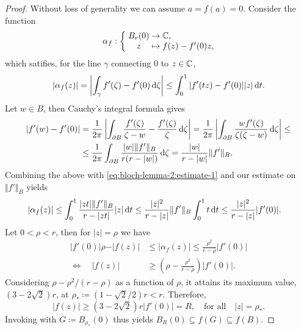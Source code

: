 \begin{proof}
    Without loss of generality we can assume $a = f(a) = 0$. Consider the function
    $$ \mapping{\alpha_f}{B_{r}(0) & \to & \C,}{z & \mapsto & f(z) - f'(0) z,} $$
    which satifies, for the line $\gamma$ connecting $0$ to $z \in \mathbb{C}$,
    \begin{equation} \label{eq:bloch-lemma-2:estimate-1}
        \vert \alpha_f(z) \vert = \left\vert \int_\gamma f'(\zeta) - f'(0) \mathop{}\!\mathrm{d} \zeta \right\vert \leq \int_0^1 \vert f'(t z) - f'(0) \vert \vert z \vert \mathop{}\!\mathrm{d} t.
    \end{equation}
    Let $w \in B$, then Cauchy's integral formula gives
    \begin{align*}
        \vert f'(w) - f'(0) \vert &= \frac{1}{2\pi} \left\vert \int_{\partial B} \frac{f'(\zeta)}{\zeta - w} - \frac{f'(\zeta)}{\zeta} \mathop{}\!\mathrm{d} \zeta \right\vert = \frac{1}{2\pi} \left\vert \int_{\partial B} \frac{w f'(\zeta)}{\zeta (\zeta - w)} \mathop{}\!\mathrm{d} \zeta \right\vert \leq \\
        &\leq \frac{1}{2\pi} \int_{\partial B} \frac{\vert w \vert \Vert f' \Vert_B}{r(r - \vert w \vert)} \mathop{}\!\mathrm{d} \zeta = \frac{\vert w \vert}{r - \vert w \vert} \Vert f' \Vert_B.
    \end{align*}
    Combining the above with \cref{eq:bloch-lemma-2:estimate-1} and our estimate on $\Vert f' \Vert_B$ yields
    \begin{align*}
        \vert \alpha_f(z) \vert &\leq \int_0^1 \frac{\vert z t \vert \Vert f' \Vert_B}{r - \vert z t \vert} \vert z \vert \mathop{}\!\mathrm{d} t \leq \frac{\vert z \vert^2}{r - \vert z \vert} \Vert f' \Vert_B \int_0^1 t \mathop{}\!\mathrm{d} t \leq \frac{\vert z \vert^2}{r - \vert z \vert} \vert f'(0) \vert.
    \end{align*}
    Let $0 < \rho < r$, then for $\vert z \vert = \rho$ we have
    \begin{align*}
        \vert f'(0) \vert \rho - \vert f(z) \vert &\leq \vert \alpha_f(z) \vert \leq \frac{\rho^2}{r - \rho} \vert f'(0) \vert \\
        \Longleftrightarrow \quad \vert f(z) \vert &\geq \left( \rho - \frac{\rho^2}{r - \rho} \right) \vert f'(0) \vert.
    \end{align*}
    Considering $\rho - \rho^2 / (r - \rho)$ as a function of $\rho$, it attains its maximum value, $(3 - 2 \sqrt{2}) r$, at $\rho_* \coloneqq (1 - \sqrt{2} / 2)r < r$. Therefore,
    \begin{equation*}
        \vert f(z) \vert \geq (3 - 2 \sqrt{2}) r \vert f'(0) \vert = R, \quad \textrm{for all} \quad \vert z \vert = \rho_*.
    \end{equation*}
    Invoking  with $G \coloneqq B_{\rho_*}(0)$ thus yields $B_{R}(0) \subseteq f(G) \subseteq f(B)$.
\end{proof}

